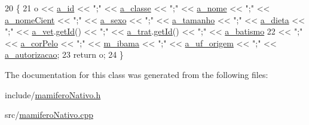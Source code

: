 \begin{DoxyCode}
20 \{
21     o << \hyperlink{classAnimal_a1eab12d1133a739dc0fea720cf6cc927}{a\_id} << \textcolor{stringliteral}{";"} << \hyperlink{classAnimal_a1f32b4455559489b5f5dce71913a6f8f}{a\_classe} << \textcolor{stringliteral}{";"} << \hyperlink{classAnimal_ad815bbe345d7c5274858ac8ccb24bc52}{a\_nome} << \textcolor{stringliteral}{";"} << 
      \hyperlink{classAnimal_af2ae0fc23b0eaf3edaee4579f6199dfc}{a\_nomeCient} << \textcolor{stringliteral}{";"} << \hyperlink{classAnimal_af2b1c520d145f82af7a5a88bb4271a0d}{a\_sexo} << \textcolor{stringliteral}{";"} << \hyperlink{classAnimal_a72366b060dfdbc0dd074fbe41decfcc2}{a\_tamanho} << \textcolor{stringliteral}{";"} << 
      \hyperlink{classAnimal_a32088524517a531af269e3ec04275135}{a\_dieta} << \textcolor{stringliteral}{";"} << \hyperlink{classAnimal_a12ce5681957e27dae674cbbde7fb1e4f}{a\_vet}.\hyperlink{classFuncionario_a0288286a907e587b7ab75d6c23354a06}{getId}() << \textcolor{stringliteral}{";"} << \hyperlink{classAnimal_a19fbf607b29b06a86f598dd1ffb8c712}{a\_trat}.\hyperlink{classFuncionario_a0288286a907e587b7ab75d6c23354a06}{getId}() << \textcolor{stringliteral}{";"} << 
      \hyperlink{classAnimal_a4e308163c5b3d82e546fb39b399bcb71}{a\_batismo}
22     << \textcolor{stringliteral}{";"} << \hyperlink{classMamifero_a7fed480798de8d55d17b3fd8cfdb24fb}{a\_corPelo} << \textcolor{stringliteral}{";"} << \hyperlink{classAnimalSilvestre_a4c92c625318b23e550b8bb24fb934d14}{m\_ibama} << \textcolor{stringliteral}{";"} << \hyperlink{classNativo_a260f26d7ad44221c1dca0ec01183482a}{a\_uf\_origem} << \textcolor{stringliteral}{";"} << 
      \hyperlink{classNativo_a1dc025166815eb0f250ce58330e4fbcb}{a\_autorizacao};
23     \textcolor{keywordflow}{return} o;
24 \}\end{DoxyCode}


The documentation for this class was generated from the following files\+:\begin{DoxyCompactItemize}
\item 
include/\hyperlink{mamiferoNativo_8h}{mamifero\+Nativo.\+h}\item 
src/\hyperlink{mamiferoNativo_8cpp}{mamifero\+Nativo.\+cpp}\end{DoxyCompactItemize}
